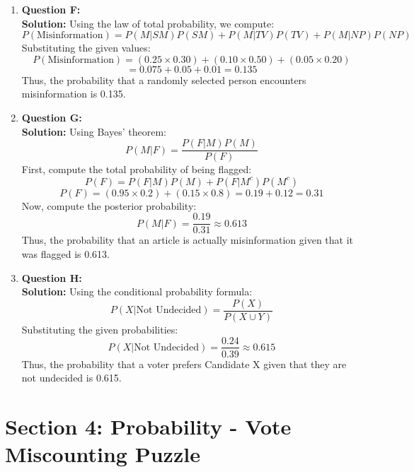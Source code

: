 \documentclass{article}
\begin{document}
\begin{enumerate}
    \item \textbf{Question F:} \\
    \textbf{Solution:} Using the law of total probability, we compute:
    \[
    P(\text{Misinformation}) = P(M | SM) P(SM) + P(M | TV) P(TV) + P(M | NP) P(NP)
    \]
    Substituting the given values:
    \[
    P(\text{Misinformation}) = (0.25 \times 0.30) + (0.10 \times 0.50) + (0.05 \times 0.20)
    \]
    \[
    = 0.075 + 0.05 + 0.01 = 0.135
    \]
    Thus, the probability that a randomly selected person encounters misinformation is 0.135.

    \item \textbf{Question G:} \\
    \textbf{Solution:} Using Bayes' theorem:
    \[
    P(M | F) = \frac{P(F | M) P(M)}{P(F)}
    \]
    First, compute the total probability of being flagged:
    \[
    P(F) = P(F | M) P(M) + P(F | M^c) P( M^c)
    \]
    \[
    P(F) = (0.95 \times 0.2) + (0.15 \times 0.8) = 0.19 + 0.12 = 0.31
    \]
    Now, compute the posterior probability:
    \[
    P(M | F) = \frac{0.19}{0.31} \approx 0.613
    \]
    Thus, the probability that an article is actually misinformation given that it was flagged is 0.613.

    \item \textbf{Question H:} \\
    \textbf{Solution:} Using the conditional probability formula:
    \[
    P(X | \text{Not Undecided}) = \frac{P(X)}{P(X \cup Y)}
    \]
    Substituting the given probabilities:
    \[
    P(X | \text{Not Undecided}) = \frac{0.24}{0.39} \approx 0.615
    \]
    Thus, the probability that a voter prefers Candidate X given that they are not undecided is 0.615.

\end{enumerate}

\section*{Section 4: Probability - Vote Miscounting Puzzle}
\end{document}
